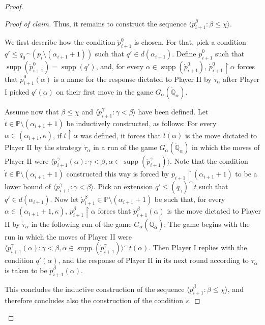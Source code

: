 \documentclass[11pt]{amsart}
\renewcommand{\restriction}{\mathbin\upharpoonright}    %
\theoremstyle{definition}
\newcounter{condition}
\theoremstyle{remark}
\newcommand\<{{<}}
\DeclareMathOperator{\supp}{supp}
\newcommand{\po}{\mathbb{P}}
\newcommand{\qo}{\mathbb{Q}}
\newcommand{\la}{\langle}
\newcommand{\ra}{\rangle}
\begin{document}
\begin{proof}
\begin{proof}[Proof of claim]
   
   Thus, it remains to construct the sequence $\langle \dot{p}_{i+1}^\beta\colon \beta\leq \chi\rangle$.

   We first describe how the condition $\dot{p}^0_{i+1}$ is chosen. For that, pick a condition $q'\leq {q_0}^{\frown} (p_i\setminus (\alpha_{i+1}+1))$ such that $q'\in d(\alpha_{i+1})$. Define $\dot{p}^0_{i+1}$ such that $\supp(\dot{p}^0_{i+1}) = \supp(q')$, and, for every $\alpha\in \supp(\dot{p}^0_{i+1})$, $\dot{p}^0_{i+1}\restriction \alpha$ forces that $\dot{p}^0_{i+1}(\alpha)$ is a name for the response dictated to Player II by $\dot{\tau}_\alpha$ after Player I picked $q'(\alpha)$ on their first move in the game $G_\alpha(\dot{\qo}_\alpha)$. 

   Assume now that $\beta\leq \chi$ and $\la \dot{p}^\gamma_{i+1} \colon \gamma<\beta \ra$ have been defined. Let $\dot{t}\in \po\setminus (\alpha_{i+1}+1)$ be inductively constructed, as follows: For every $\alpha\in (\alpha_{i+1}, \kappa)$, if $\dot{t}\restriction \alpha$ was defined, it forces that $\dot{t}(\alpha)$ is the move dictated to Player II by the strategy $\dot{\tau}_\alpha$ in a run of the game $G_{\alpha}(\dot{\qo}_\alpha)$ in which the moves of Player II were $\la \dot{p}^\gamma_{i+1}(\alpha) \colon \gamma<\beta, \alpha\in \supp(\dot{p}^\gamma_{i+1}) \ra$. Note that the condition $\dot{t}\in \po\setminus (\alpha_{i+1}+1)$ constructed this way is forced by $p_{i+1}\restriction (\alpha_{i+1}+1)$ to be a lower bound of $\la  \dot{p}^\gamma_{i+1} \colon \gamma<\beta\ra$. Pick an extension $q'\leq (q_{\gamma})^{\frown} \dot{t}$ such that $q'\in d(\alpha_{i+1})$. Now let $\dot{p}^{\beta}_{i+1}\in \po\setminus (\alpha_{i+1}+1)$ be such that, for every $\alpha\in (\alpha_{i+1}+1, \kappa)$, $\dot{p}^\beta_{i+1}\restriction \alpha$ forces that $\dot{p}^\beta_{i+1}(\alpha)$ is the move dictated to Player II by $\dot{\tau}_\alpha$ in the following run of the game $G_\alpha(\dot{\qo}_\alpha)$: The game begins with the run in which the moves of Player II were $\la \dot{p}^\gamma_{i+1}(\alpha) \colon \gamma<\beta, \alpha\in \supp(\dot{p}^\gamma_{i+1}) \ra^{\frown} \dot{t}(\alpha)$. Then Player I replies with the condition $q'(\alpha)$, and the response of Player II in its next round according to $\dot{\tau}_\alpha$ is taken to be $\dot{p}^\beta_{i+1}(\alpha)$.  

   This concludes the inductive construction of  the sequence $\la \dot{p}^\beta_{i+1} \colon \beta\leq \chi \ra$, and therefore concludes also the construction of the condition $\dot{s}$.
 

\end{proof}
\end{proof}
\end{document}

